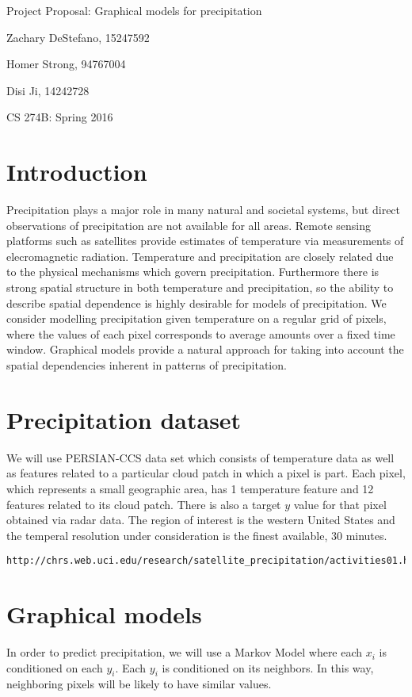 \documentclass[twoside,11pt]{article}
\theoremstyle{definition}
\begin{document}
\centerline{\Large Project Proposal: Graphical models for precipitation}
\centerline{Zachary DeStefano, 15247592}
\centerline{Homer Strong, 94767004}
\centerline{Disi Ji, 14242728}
\centerline{CS 274B: Spring 2016}

\section*{Introduction}
Precipitation plays a major role in many natural and societal systems, but direct observations of precipitation are not available for all areas. Remote sensing platforms such as satellites provide estimates of temperature via measurements of elecromagnetic radiation. Temperature and precipitation are closely related due to the physical mechanisms which govern precipitation. Furthermore there is strong spatial structure in both temperature and precipitation, so the ability to describe spatial dependence is highly desirable for models of precipitation. We consider modelling precipitation given temperature on a regular grid of pixels, where the values of each pixel corresponds to average amounts over a fixed time window. Graphical models provide a natural approach for taking into account the spatial dependencies inherent in patterns of precipitation.

\section*{Precipitation dataset}
We will use PERSIAN-CCS data set which consists of temperature data as well as features related to a particular cloud patch in which a pixel is part. Each pixel, which represents a small geographic area, has 1 temperature feature and 12 features related to its cloud patch. There is also a target $y$ value for that pixel obtained via radar data. The region of interest is the western United States and the temperal resolution under consideration is the finest available, 30 minutes.

\begin{lstlisting}
http://chrs.web.uci.edu/research/satellite_precipitation/activities01.html
\end{lstlisting}

\section*{Graphical models}
In order to predict precipitation, we will use a Markov Model where each $x_i$ is conditioned on each $y_i$. Each $y_i$ is conditioned on its neighbors. In this way, neighboring pixels will be likely to have similar values.
\end{document}
